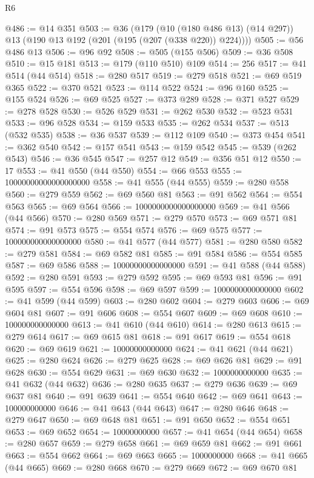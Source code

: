 \begin{lexlean}{R6}
\begin{coremodule}
@486 := @14 @351
@503 := @36
    (@179
      (@10 (@180 @486 @13) (@14 @297))
      @13
      (@190 @13 @192 (@201 (@195 (@207 (@338 @220)) @224))))
@505 := @56 @486 @13
@506 := @96 @92
@508 := @505 (@155 @506)
@509 := @36 @508
@510 := @15 @181
@513 := @179 (@110 @510) @109
@514 := 256
@517 := @41 @514 (@44 @514)
@518 := @280 @517
@519 := @279 @518
@521 := @69 @519 @365
@522 := @370 @521
@523 := @114 @522
@524 := @96 @160
@525 := @155 @524
@526 := @69 @525
@527 := @373 @289
@528 := @371 @527
@529 := @278 @528
@530 := @526 @529
@531 := @262 @530
@532 := @523 @531
@533 := @96 @528
@534 := @159 @533
@535 := @262 @534
@537 := @513 (@532 @535)
@538 := @36 @537
@539 := @112 @109
@540 := @373 @454
@541 := @362 @540
@542 := @157 @541
@543 := @159 @542
@545 := @539 (@262 @543)
@546 := @36 @545
@547 := @257 @12
@549 := @356 @51 @12
@550 := 17
@553 := @41 @550 (@44 @550)
@554 := @66 @553
@555 := 10000000000000000000
@558 := @41 @555 (@44 @555)
@559 := @280 @558
@560 := @279 @559
@562 := @69 @560 @81
@563 := @91 @562
@564 := @554 @563
@565 := @69 @564
@566 := 1000000000000000000
@569 := @41 @566 (@44 @566)
@570 := @280 @569
@571 := @279 @570
@573 := @69 @571 @81
@574 := @91 @573
@575 := @554 @574
@576 := @69 @575
@577 := 100000000000000000
@580 := @41 @577 (@44 @577)
@581 := @280 @580
@582 := @279 @581
@584 := @69 @582 @81
@585 := @91 @584
@586 := @554 @585
@587 := @69 @586
@588 := 10000000000000000
@591 := @41 @588 (@44 @588)
@592 := @280 @591
@593 := @279 @592
@595 := @69 @593 @81
@596 := @91 @595
@597 := @554 @596
@598 := @69 @597
@599 := 1000000000000000
@602 := @41 @599 (@44 @599)
@603 := @280 @602
@604 := @279 @603
@606 := @69 @604 @81
@607 := @91 @606
@608 := @554 @607
@609 := @69 @608
@610 := 100000000000000
@613 := @41 @610 (@44 @610)
@614 := @280 @613
@615 := @279 @614
@617 := @69 @615 @81
@618 := @91 @617
@619 := @554 @618
@620 := @69 @619
@621 := 10000000000000
@624 := @41 @621 (@44 @621)
@625 := @280 @624
@626 := @279 @625
@628 := @69 @626 @81
@629 := @91 @628
@630 := @554 @629
@631 := @69 @630
@632 := 1000000000000
@635 := @41 @632 (@44 @632)
@636 := @280 @635
@637 := @279 @636
@639 := @69 @637 @81
@640 := @91 @639
@641 := @554 @640
@642 := @69 @641
@643 := 100000000000
@646 := @41 @643 (@44 @643)
@647 := @280 @646
@648 := @279 @647
@650 := @69 @648 @81
@651 := @91 @650
@652 := @554 @651
@653 := @69 @652
@654 := 10000000000
@657 := @41 @654 (@44 @654)
@658 := @280 @657
@659 := @279 @658
@661 := @69 @659 @81
@662 := @91 @661
@663 := @554 @662
@664 := @69 @663
@665 := 1000000000
@668 := @41 @665 (@44 @665)
@669 := @280 @668
@670 := @279 @669
@672 := @69 @670 @81

\end{coremodule}
\end{lexlean}
